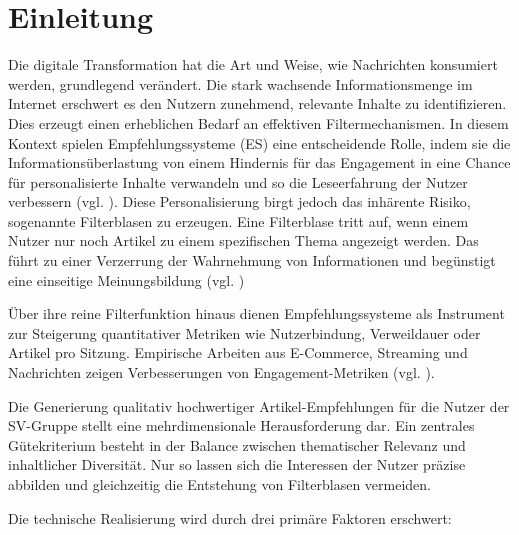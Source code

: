 \section{Einleitung}

Die digitale Transformation hat die Art und Weise, wie Nachrichten konsumiert werden, grundlegend verändert. 
Die stark wachsende Informationsmenge im Internet erschwert es den Nutzern zunehmend,
relevante Inhalte zu identifizieren. Dies erzeugt einen erheblichen Bedarf an effektiven Filtermechanismen.
In diesem Kontext spielen Empfehlungssysteme (ES) eine entscheidende Rolle, 
indem sie die Informationsüberlastung von einem Hindernis für das Engagement in eine Chance für personalisierte 
Inhalte verwandeln und so die Leseerfahrung der Nutzer verbessern (vgl. \cite{wu_personalized_2022}).
Diese Personalisierung birgt jedoch das inhärente Risiko, sogenannte Filterblasen zu erzeugen.
Eine Filterblase tritt auf, wenn einem Nutzer nur noch Artikel zu einem spezifischen Thema angezeigt werden. 
Das führt zu einer Verzerrung der Wahrnehmung von Informationen und begünstigt eine einseitige Meinungsbildung (vgl. \cite{nguyen_filter_bubble_2014})

Über ihre reine Filterfunktion hinaus dienen Empfehlungssysteme als Instrument zur Steigerung quantitativer 
Metriken wie Nutzerbindung, Verweildauer oder Artikel pro Sitzung. Empirische Arbeiten aus 
E-Commerce, Streaming und Nachrichten zeigen Verbesserungen von Engagement-Metriken 
(vgl. \cite{linden_amazon_2003,covington_DNN_YT_Recommendations_2016,raza_news_2020}).

Die Generierung qualitativ hochwertiger Artikel-Empfehlungen für die Nutzer der \ac{SV-Gruppe} stellt eine 
mehrdimensionale Herausforderung dar. 
Ein zentrales Gütekriterium besteht in der Balance zwischen thematischer Relevanz und inhaltlicher Diversität. 
Nur so lassen sich die Interessen der Nutzer präzise abbilden und gleichzeitig die Entstehung von Filterblasen vermeiden.

Die technische Realisierung wird durch drei primäre Faktoren erschwert:

